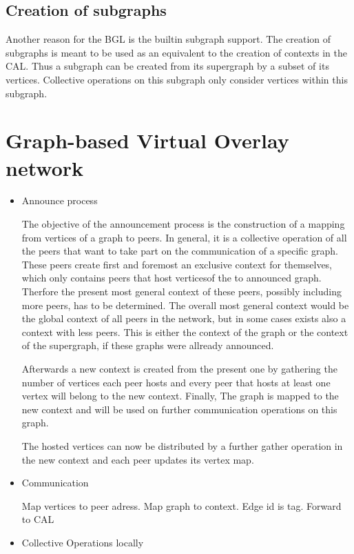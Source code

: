 \subsection{Creation of subgraphs}
Another reason for the BGL is the builtin subgraph support. The
creation of subgraphs is meant to be used as an equivalent to the
creation of contexts in the CAL. Thus a subgraph can be created from
its supergraph by a subset of its vertices. Collective operations on
this subgraph only consider vertices within this subgraph.

\section{Graph-based Virtual Overlay network}

\begin{itemize}
\item Announce process

  The objective of the announcement process is the construction of a
  mapping from vertices of a graph to peers. In general, it is a
  collective operation of all the peers that want to take part on the
  communication of a specific graph.  These peers create first and
  foremost an exclusive context for themselves, which only contains
  peers that host verticesof the to announced graph.  Therfore the
  present most general context of these peers, possibly including more
  peers, has to be determined.  The overall most general context would
  be the global context of all peers in the network, but in some cases
  exists also a context with less peers. This is either the context of
  the graph or the context of the supergraph, if these graphs were
  allready announced.

  Afterwards a new context is created from the present one by
  gathering the number of vertices each peer hosts and every peer that
  hosts at least one vertex will belong to the new context.  Finally,
  The graph is mapped to the new context and will be used on further
  communication operations on this graph.

  The hosted vertices can now be distributed by a further gather
  operation in the new context and each peer updates its vertex map.

\item Communication

  Map vertices to peer adress.  Map graph to context.  Edge id is tag.
  Forward to CAL

\item Collective Operations locally


\end{itemize}
